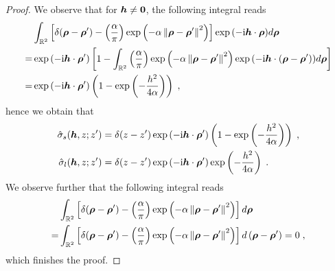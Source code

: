 \begin{proof}
We observe that for $\boldsymbol{h}\neq\bm{0}$, the following integral reads %
\begin{align*}
 & \int_{\mathbb{R}^2}\left[\delta(\bm{\rho}-\bm{\rho}^\prime)- {\left( \frac{\alpha}{\pi} \right)} \exp{\left(-\alpha \left\lVert\bm{\rho}-\bm{\rho}^\prime\right\rVert^2\right)}\right] \exp{(-\mathrm{i} \boldsymbol{h} \cdot \boldsymbol{\rho})} d \bm{\rho} \\
 =&\exp{(-\mathrm{i} \boldsymbol{h} \cdot \boldsymbol{\rho}^\prime)}\left[1-  \int_{\mathbb{R}^2}{\left( \frac{\alpha}{\pi} \right)} \exp{\left(-\alpha \left\lVert\bm{\rho}-\bm{\rho}^\prime\right\rVert^2\right)}  \exp{(-\mathrm{i} \boldsymbol{h} \cdot (\boldsymbol{\rho}-\bm{\rho}^\prime))} d \bm{\rho}\right]\\
 =&\exp{(-\mathrm{i} \boldsymbol{h} \cdot \boldsymbol{\rho}^\prime)}\left(1-\exp\left(-\frac{h^2}{4\alpha}\right)\right)\;,
\end{align*}
hence we obtain that 
\begin{align*}
 \Hat{\sigma}_{s}(\boldsymbol{h},z;z^\prime) &= \delta(z-z^\prime) \exp{(-\mathrm{i} \boldsymbol{h} \cdot \boldsymbol{\rho}^\prime)}\left(1-\exp\left(-\frac{h^2}{4\alpha}\right)\right)\;,  \\
 \Hat{\sigma}_{l}(\boldsymbol{h},z;z^\prime) &= \delta(z-z^\prime) \exp{(-\mathrm{i} \boldsymbol{h} \cdot \boldsymbol{\rho}^\prime)}\exp\left(-\frac{h^2}{4\alpha}\right)\;.
\end{align*}
We observe further that the following integral reads
\begin{align*}
 & \int_{\mathbb{R}^2}\left[\delta(\bm{\rho}-\bm{\rho}^\prime)- {\left( \frac{\alpha}{\pi} \right)} \exp{\left(-\alpha \left\lVert\bm{\rho}-\bm{\rho}^\prime\right\rVert^2\right)}\right]  d \bm{\rho} \\
 =&\int_{\mathbb{R}^2}\left[\delta(\bm{\rho}-\bm{\rho}^\prime)- {\left( \frac{\alpha}{\pi} \right)} \exp{\left(-\alpha \left\lVert\bm{\rho}-\bm{\rho}^\prime\right\rVert^2\right)}\right]  d \left(\bm{\rho}-\bm{\rho}^\prime\right) =0\;,
\end{align*}
which finishes the proof.
\end{proof}
